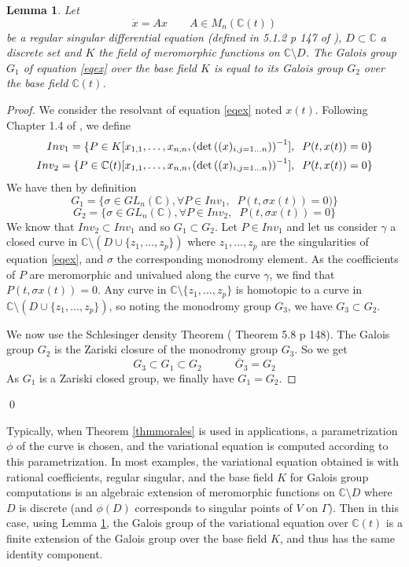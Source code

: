 \documentclass[smallcondensed]{svjour3}
\newtheorem{lem}[thm]{Lemma}
\begin{document}
\begin{lem}\label{schle}
Let 
\begin{equation}\label{eqex}
\dot{x}=Ax \qquad  A\in M_n(\mathbb{C}(t))
\end{equation}
be a regular singular differential equation (defined in 5.1.2 p 147 of \cite{42}), $D\subset \mathbb{C}$ a discrete set and $K$ the field of meromorphic functions on $\mathbb{C}\setminus D$. The Galois group $G_1$ of equation \eqref{eqex} over the base field $K$ is equal to its Galois group $G_2$ over the base field $\mathbb{C}(t)$.
\end{lem}

\begin{proof}
We consider the resolvant of equation \eqref{eqex} noted $x(t)$. Following Chapter 1.4 of \cite{42}, we define
\begin{equation}\begin{split}\label{inv}
Inv_1=\{P\in K[x_{1,1},\dots,x_{n,n},\left(\hbox{det}\left((x)_{i,j=1\dots n}\right)\right)^{-1}],\;\;P(t,x(t))=0\} \\
Inv_2=\{P\in \mathbb{C}(t)[x_{1,1},\dots,x_{n,n},\left(\hbox{det}\left((x)_{i,j=1\dots n}\right)\right)^{-1}],\;\;P(t,x(t))=0\}
\end{split}\end{equation}
We have then by definition
$$G_1=\{\sigma\in GL_n(\mathbb{C}), \forall P\in Inv_1,\;\;P(t,\sigma x(t))=0)\}$$
$$G_2=\{\sigma\in GL_n(\mathbb{C}), \forall P\in Inv_2,\;\;P(t,\sigma x(t))=0\}$$
We know that $Inv_2 \subset Inv_1$ and so $G_1 \subset G_2$. Let $P\in Inv_1$ and let us consider $\gamma$ a closed curve in $\mathbb{C}\setminus \left( D\cup \{z_1,\dots,z_p\}\right)$ where $z_1,\dots,z_p$ are the singularities of equation \eqref{eqex}, and $\sigma$ the corresponding monodromy element. As the coefficients of $P$ are meromorphic and univalued along the curve $\gamma$, we find that $P(t,\sigma x(t))=0$. Any curve in $\mathbb{C}\setminus \{z_1,\dots,z_p\}$ is homotopic to a curve in $\mathbb{C}\setminus \left( D\cup \{z_1,\dots,z_p\}\right)$, so noting the monodromy group $G_3$, we have $G_3 \subset G_2$.

We now use the Schlesinger density Theorem (\cite{42} Theorem 5.8 p 148). The Galois group $G_2$ is the Zariski closure of the monodromy group $G_3$. So we get
$$G_3\subset G_1 \subset G_2 \qquad\quad \overline{G}_3= G_2$$
As $G_1$ is a Zariski closed group, we finally have $G_1=G_2$.
\end{proof}\qed

Typically, when Theorem \ref{thmmorales} is used in applications, a parametrization $\phi$ of the curve is chosen, and the variational equation is computed according to this parametrization. In most examples, the variational equation obtained is with rational coefficients, regular singular, and the base field $K$ for Galois group computations is an algebraic extension of meromorphic functions on $\mathbb{C}\setminus D$ where $D$ is discrete (and $\phi(D)$ corresponds to singular points of $V$ on $\Gamma$). Then in this case, using Lemma \ref{schle}, the Galois group of the variational equation over $\mathbb{C}(t)$ is a finite extension of the Galois group over the base field $K$, and thus has the same identity component.
\end{document}
